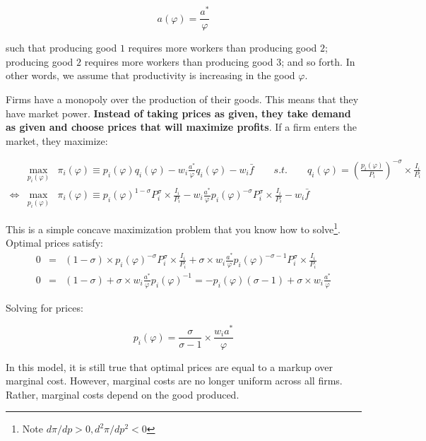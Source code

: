 \documentclass[11pt,letterpaper]{article}
\begin{document}
\begin{equation*}
    a(\varphi) = \frac{a^*}{\varphi}
\end{equation*}

\noindent such that producing good $1$ requires more workers than producing good $2$; producing good $2$ requires more workers than producing good $3$; and so forth. In other words, we assume that productivity is increasing in the good $\varphi$. 

Firms have a monopoly over the production of their goods. This means that they have market power. \textbf{Instead of taking prices as given, they take demand as given and choose prices that will maximize profits}. If a firm enters the market, they maximize:

\begin{eqnarray*}
    &\max_{p_i(\varphi)}& \pi_i(\varphi) \equiv p_i(\varphi) q_i(\varphi) - w_i \frac{a^*}{\varphi} q_i(\varphi) - w_i \bar{f} \qquad s.t. \qquad   q_i(\varphi) = \left( \frac{p_i(\varphi)}{P_i} \right)^{-\sigma}  \times \frac{I_i}{P_i} \\
\iff &\max_{p_i(\varphi)}&  \pi_i(\varphi) \equiv p_i(\varphi)^{1-\sigma} P_i^{\sigma}  \times \frac{I_i}{P_i} - w_i \frac{a^*}{\varphi} p_i(\varphi)^{-\sigma} P_i^{\sigma}  \times \frac{I_i}{P_i} - w_i \bar{f} 
\end{eqnarray*}

This is a simple concave maximization problem that you know how to solve\footnote{Note $d \pi / dp > 0, d^2 \pi / dp^2 < 0$}. Optimal prices satisfy:
\begin{eqnarray*}
    0 &=& (1-\sigma)\times p_i(\varphi)^{-\sigma} P_i^{\sigma}  \times \frac{I_i}{P_i} + \sigma \times w_i \frac{a^*}{\varphi} p_i(\varphi)^{-\sigma-1} P_i^{\sigma} \times \frac{I_i}{P_i}  \\
    0 &=& (1-\sigma) + \sigma \times w_i \frac{a^*}{\varphi} p_i(\varphi)^{-1}  = -p_i(\varphi)(\sigma-1) + \sigma \times w_i \frac{a^*}{\varphi}
\end{eqnarray*}

Solving for prices:

\begin{equation*}
    \boxed{
    p_i(\varphi) = \frac{\sigma}{\sigma-1} \times  \frac{w_i a^*}{\varphi}
    }
\end{equation*}

In this model, it is still true that optimal prices are equal to a markup over marginal cost. However, marginal costs are no longer uniform across all firms. Rather, marginal costs depend on the good produced.
\end{document}
